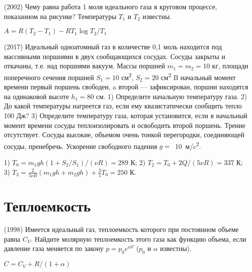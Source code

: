 \begin{ex}
(2002) Чему равна работа 1 моля идеального газа в круговом процессе, показанном на рисунке? Температуры $T_1$ и $T_2$ известны.
\begin{center}

\end{center}
\begin{ans}
$A= R(T_2-T_1)-RT_1 \log T_2/T_1$
\end{ans}
\end{ex}

\begin{ex}
(2017) Идеальный одноатомный газ в количестве 0,1 моль находится под массивными поршнями в двух сообщающихся сосудах. Сосуды закрыты и откачаны, т.е. над поршнями вакуум. Массы поршней $m_1 = m_2 = 10$ кг, площади поперечного сечения поршней $S_1 = 10$ см\textsuperscript{2}, $S_2 = 20$ см\textsuperscript{2} B начальный момент времени первый поршень свободен, a второй — зафиксирован, поршни находятся на одинаковой высоте $h_1 = 80$ см. 1) Определите начальную температуру газа. 2) До какой температуры нагреется газ, если ему квазистатически сообщить тепло 100 Дж? 3) Определите температуру газа, которая установится, если в начальный момент времени сосуды теплоизолировать и освободить второй поршень. Трение отсутствует. Сосуды высокие, объемом очень тонкой перегородки, соединяющей сосуды, пренебречь. Ускорение свободного падения $g =$~10~м/c\textsuperscript{2}.
\begin{center}

\end{center}
\begin{ans}
1) $T_0 = m_1gh(1+S_2/S_1)/(\nu R) = 289$ К;
2) $T_2 = T_0 + 2Q/(5\nu R) = 337$ К; 
3) $T_3 = \frac{2}{5\nu R}(m_1 gh + m_2 gh)+ \frac{3}{5}T_0 = 250$ К.
\end{ans}
\end{ex}

\section{Теплоемкость}

\begin{ex}
(1998) Имеется идеальный газ, теплоемкость которого при постоянном объеме равна $C_V$. 
Найдите молярную теплоемкость этого газа как функцию объема, если давление газа меняется по закону $p=p_0 e^{\alpha V}$ ($p_0$ и $\alpha$ известны).
\begin{ans}
$C = C_V + R/(1+\alpha)$
\end{ans}
\end{ex}

